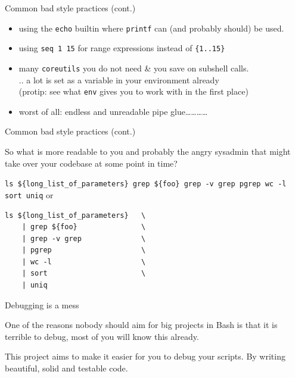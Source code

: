 \begin{frame}{Common bad style practices (cont.)}

\begin{itemize}
\itemsep1pt\parskip0pt
\item
  using the \texttt{echo} builtin where \texttt{printf} can (and
  probably should) be used.
\item
  using \texttt{seq 1 15} for range expressions instead of
  \texttt{\{1..15\}}
\item
  many \texttt{coreutils} you do not need \& you save on subshell
  calls.\\ .. a lot is set as a variable in your environment already\\
  (protip: see what \texttt{env} gives you to work with in the first
  place)
\item
  worst of all: endless and unreadable pipe
  glue\ldots{}\ldots{}\ldots{}\ldots{}
\end{itemize}

\end{frame}

\begin{frame}[fragile]{Common bad style practices (cont.)}

So what is more readable to you and probably the angry sysadmin that
might take over your codebase at some point in time? \vspace{20px}

\texttt{ls \$\{long\_list\_of\_parameters\} \textbar{} grep \$\{foo\} \textbar{} grep -v grep \textbar{} pgrep \textbar{} wc -l \textbar{} sort \textbar{} uniq}
\newline
\newline
or

\begin{verbatim}
ls ${long_list_of_parameters}   \
    | grep ${foo}               \
    | grep -v grep              \
    | pgrep                     \
    | wc -l                     \
    | sort                      \
    | uniq
\end{verbatim}

\end{frame}

\begin{frame}{}

\end{frame}

\begin{frame}{Debugging is a mess}

One of the reasons nobody should aim for big projects in Bash is that it
is terrible to debug, most of you will know this already. \vfill

This project aims to make it easier for you to debug your scripts. By
writing beautiful, solid and testable code.

\end{frame}

